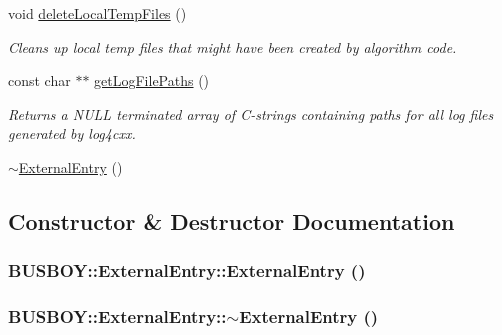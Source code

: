 \begin{DoxyCompactItemize}
void \hyperlink{classBUSBOY_1_1ExternalEntry_a4746165d3329bb8e09cf0a94f9e4b037}{deleteLocalTempFiles} ()
\begin{DoxyCompactList}\small\item\em Cleans up local temp files that might have been created by algorithm code. \item\end{DoxyCompactList}\item 
const char $\ast$$\ast$ \hyperlink{classBUSBOY_1_1ExternalEntry_a35379f7683120c533337e0fa5ebc079a}{getLogFilePaths} ()
\begin{DoxyCompactList}\small\item\em Returns a NULL terminated array of C-\/strings containing paths for all log files generated by log4cxx. \item\end{DoxyCompactList}\item 
\hyperlink{classBUSBOY_1_1ExternalEntry_a02df6f5e6d2f2d5d871aef343dda56f3}{$\sim$ExternalEntry} ()
\end{DoxyCompactItemize}


\subsection{Constructor \& Destructor Documentation}
\hypertarget{classBUSBOY_1_1ExternalEntry_a3b077bb1c81479d3211f3c1872837114}{
\subsubsection[{ExternalEntry}]{\setlength{\rightskip}{0pt plus 5cm}BUSBOY::ExternalEntry::ExternalEntry ()}}
\label{classBUSBOY_1_1ExternalEntry_a3b077bb1c81479d3211f3c1872837114}
\hypertarget{classBUSBOY_1_1ExternalEntry_a02df6f5e6d2f2d5d871aef343dda56f3}{
\subsubsection[{$\sim$ExternalEntry}]{\setlength{\rightskip}{0pt plus 5cm}BUSBOY::ExternalEntry::$\sim$ExternalEntry ()}}
\label{classBUSBOY_1_1ExternalEntry_a02df6f5e6d2f2d5d871aef343dda56f3}


